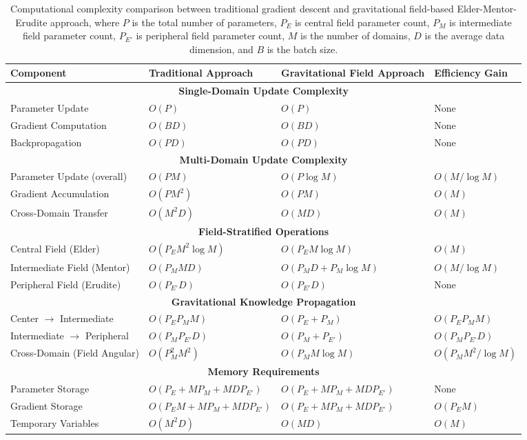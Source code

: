 \begin{definition}
\begin{theorem}
\begin{table}[h]
\centering
\begin{tabular}{|p{3cm}|p{4.5cm}|p{4.5cm}|p{3cm}|}
\hline
\textbf{Component} & \textbf{Traditional Approach} & \textbf{Gravitational Field Approach} & \textbf{Efficiency Gain} \\
\hline
\multicolumn{4}{|c|}{\textbf{Single-Domain Update Complexity}} \\
\hline
Parameter Update & $O(P)$ & $O(P)$ & None \\
\hline
Gradient Computation & $O(BD)$ & $O(BD)$ & None \\
\hline
Backpropagation & $O(PD)$ & $O(PD)$ & None \\
\hline
\multicolumn{4}{|c|}{\textbf{Multi-Domain Update Complexity}} \\
\hline
Parameter Update (overall) & $O(PM)$ & $O(P \log M)$ & $O(M/\log M)$ \\
\hline
Gradient Accumulation & $O(PM^2)$ & $O(PM)$ & $O(M)$ \\
\hline
Cross-Domain Transfer & $O(M^2D)$ & $O(MD)$ & $O(M)$ \\
\hline
\multicolumn{4}{|c|}{\textbf{Field-Stratified Operations}} \\
\hline
Central Field (Elder) & $O(P_E M^2 \log M)$ & $O(P_E M \log M)$ & $O(M)$ \\
\hline
Intermediate Field (Mentor) & $O(P_M M D)$ & $O(P_M D + P_M \log M)$ & $O(M/\log M)$ \\
\hline
Peripheral Field (Erudite) & $O(P_{E'} D)$ & $O(P_{E'} D)$ & None \\
\hline
\multicolumn{4}{|c|}{\textbf{Gravitational Knowledge Propagation}} \\
\hline
Center $\to$ Intermediate & $O(P_E P_M M)$ & $O(P_E + P_M)$ & $O(P_E P_M M)$ \\
\hline
Intermediate $\to$ Peripheral & $O(P_M P_{E'} D)$ & $O(P_M + P_{E'})$ & $O(P_M P_{E'} D)$ \\
\hline
Cross-Domain (Field Angular) & $O(P_M^2 M^2)$ & $O(P_M M \log M)$ & $O(P_M M^2/\log M)$ \\
\hline
\multicolumn{4}{|c|}{\textbf{Memory Requirements}} \\
\hline
Parameter Storage & $O(P_E + MP_M + MD P_{E'})$ & $O(P_E + MP_M + MD P_{E'})$ & None \\
\hline
Gradient Storage & $O(P_E M + MP_M + MD P_{E'})$ & $O(P_E + MP_M + MD P_{E'})$ & $O(P_E M)$ \\
\hline
Temporary Variables & $O(M^2D)$ & $O(MD)$ & $O(M)$ \\
\hline
\end{tabular}
\caption{Computational complexity comparison between traditional gradient descent and gravitational field-based Elder-Mentor-Erudite approach, where $P$ is the total number of parameters, $P_E$ is central field parameter count, $P_M$ is intermediate field parameter count, $P_{E'}$ is peripheral field parameter count, $M$ is the number of domains, $D$ is the average data dimension, and $B$ is the batch size.}
\label{tab:complexity_comparison}
\end{table}


\end{theorem}
\end{definition}
